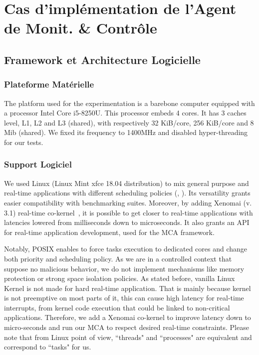 \documentclass[french, a4paper, 11pt, twoside, pdftex]{StyleThese}
\begin{document}
\setcounter{chapter}{5} %
\dominitoc
\faketableofcontents
\fi

\chapter{Cas d'implémentation de l'Agent de Monit. \& Contrôle} \label{chap:5_ImplementationCase}
\minitoc

    \section{Framework et Architecture Logicielle}
    
        \subsection{Plateforme Matérielle}
                        The platform used for the experimentation is a barebone computer equipped with a processor Intel Core i5-8250U. This processor embeds 4 cores. It has 3 caches level, L1, L2 and L3 (shared), with respectively 32 KiB/core, 256 KiB/core and 8 Mib (shared). We fixed its frequency to 1400MHz and disabled hyper-threading for our tests.
        \subsection{Support Logiciel}
                    We used Linux (Linux Mint xfce 18.04 distribution) to mix general purpose and real-time applications with different scheduling policies (\cite{wong_towards_2008}, \cite{lelli_efficient_2011}). Its versatility grants easier compatibility with benchmarking suites. Moreover, by adding Xenomai (v. 3.1) real-time co-kernel~\cite{gerum_xenomai_2004}, it is possible to get closer to real-time applications with latencies lowered from milliseconds down to microseconds. It also grants an API for real-time application development, used for the MCA framework.
                        
                        Notably, POSIX enables to force tasks execution to dedicated cores and change both priority and scheduling policy. As we are in a controlled context that suppose no malicious behavior, we do not implement mechanisms like memory protection or strong space isolation policies. As stated before, vanilla Linux Kernel is not made for hard real-time application. That is mainly because kernel is not preemptive on most parts of it, this can cause high latency for real-time interrupts, from kernel code execution that could be linked to non-critical applications. %
                        Therefore, we add a Xenomai co-kernel to improve latency down to micro-seconds and run our MCA to respect desired real-time constraints.
                        Please note that from Linux point of view, ``threads" and ``processes" are equivalent and correspond to ``tasks" for us.
            
\end{document}

